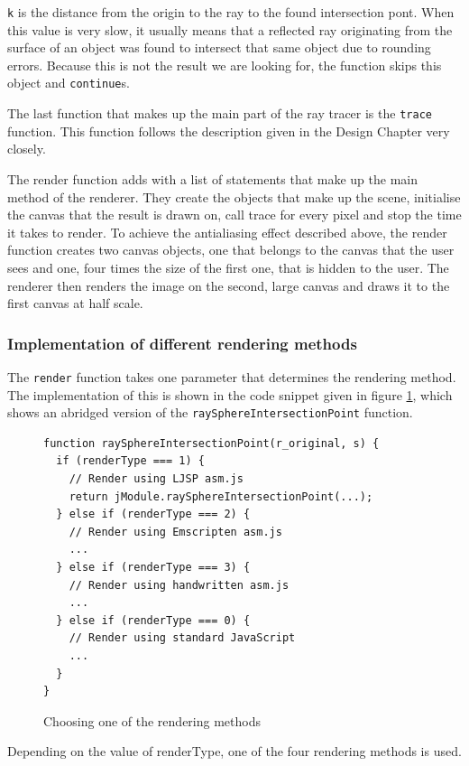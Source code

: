 \documentclass[11pt]{report}
\begin{document}
\texttt{k} is the distance from the origin to the ray to the found intersection pont. When this value is very slow, it usually means that a reflected ray originating from the surface of an object was found to intersect that same object due to rounding errors. Because this is not the result we are looking for, the function skips this object and \texttt{continue}s.

The last function that makes up the main part of the ray tracer is the \texttt{trace} function. This function follows the description given in the Design Chapter very closely.

The render function adds with a list of statements that make up the main method of the renderer. They create the objects that make up the scene, initialise the canvas that the result is drawn on, call trace for every pixel and stop the time it takes to render. To achieve the antialiasing effect described above, the render function creates two canvas objects, one that belongs to the canvas that the user sees and one, four times the size of the first one, that is hidden to the user. The renderer then renders the image on the second, large canvas and draws it to the first canvas at half scale. 

\subsubsection{Implementation of different rendering methods}

The \texttt{render} function takes one parameter that determines the rendering method. The implementation of this is shown in the code snippet given in figure \ref{irenderer2}, which shows an abridged version of the \texttt{raySphereIntersectionPoint} function.

\begin{figure}[ht]
\begin{lstlisting}
function raySphereIntersectionPoint(r_original, s) {
  if (renderType === 1) {
    // Render using LJSP asm.js
    return jModule.raySphereIntersectionPoint(...);
  } else if (renderType === 2) {
    // Render using Emscripten asm.js
    ...
  } else if (renderType === 3) {
    // Render using handwritten asm.js
    ...
  } else if (renderType === 0) {
    // Render using standard JavaScript
    ...
  }
}
\end{lstlisting}
\caption{Choosing one of the rendering methods}
\label{irenderer2}
\end{figure}

Depending on the value of renderType, one of the four rendering methods is used.
\end{document}
